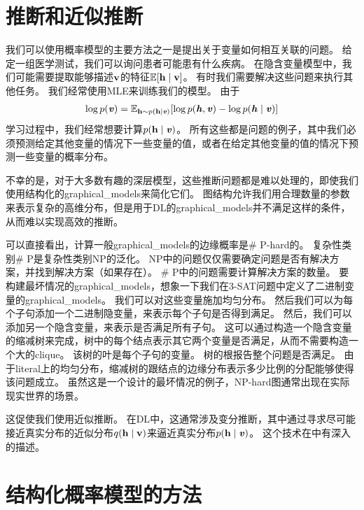 \section{推断和近似推断}
\label{sec:inference_and_approximate_inference}


我们可以使用概率模型的主要方法之一是提出关于变量如何相互关联的问题。 
给定一组医学测试，我们可以询问患者可能患有什么疾病。
在隐含变量模型中，我们可能需要提取能够描述$\mathbf{v}$的特征$\mathbb{E}[\mathbf{h} \mid \mathbf{v}]$。
有时我们需要解决这些问题来执行其他任务。 
我们经常使用\gls{MLE}来训练我们的模型。
由于
\begin{align}
\label{eqn:169}
\log p(\boldsymbol{\mathit{v}}) = \mathbb{E}_{\mathbf{h} \sim p(\mathbf{h}\mid \boldsymbol{\mathit{v}})} [\log p(\boldsymbol{\mathit{h}},\boldsymbol{\mathit{v}}) -  \log p(\boldsymbol{\mathit{h}}\mid\boldsymbol{\mathit{v}})]
\end{align}
学习过程中，我们经常想要计算$p(\mathbf{h}\mid\boldsymbol{\mathit{v}})$。
所有这些都是问题的例子，其中我们必须预测给定其他变量的情况下一些变量的值，或者在给定其他变量的值的情况下预测一些变量的概率分布。

不幸的是，对于大多数有趣的深层模型，这些推断问题都是难以处理的，即使我们使用结构化的\gls{graphical_models}来简化它们。
图结构允许我们用合理数量的参数来表示复杂的高维分布，但是用于\gls{DL}的\gls{graphical_models}并不满足这样的条件，从而难以实现高效的推断。


可以直接看出，计算一般\gls{graphical_models}的边缘概率是\# P-hard的。
复杂性类别\# P是复杂性类别NP的泛化。
NP中的问题仅仅需要确定问题是否有解决方案，并找到解决方案（如果存在）。
\# P中的问题需要计算解决方案的数量。
要构建最坏情况的\gls{graphical_models}，想象一下我们在3-SAT问题中定义了二进制变量的\gls{graphical_models}。
我们可以对这些变量施加均匀分布。
然后我们可以为每个子句添加一个二进制隐变量，来表示每个子句是否得到满足。
然后，我们可以添加另一个隐含变量，来表示是否满足所有子句。
这可以通过构造一个隐含变量的缩减树来完成，树中的每个结点表示其它两个变量是否满足，从而不需要构造一个大的\gls{clique}。
该树的叶是每个子句的变量。
树的根报告整个问题是否满足。
由于literal上的均匀分布，缩减树的跟结点的边缘分布表示多少比例的分配能够使得该问题成立。
虽然这是一个设计的最坏情况的例子，NP-hard图通常出现在实际现实世界的场景。


这促使我们使用近似推断。
在\gls{DL}中，这通常涉及变分推断，其中通过寻求尽可能接近真实分布的近似分布$q(\mathbf{h}\mid\mathbf{v})$来逼近真实分布$p(\mathbf{h}\mid\boldsymbol{\mathit{v}})$。
这个技术在中有深入的描述。



\section{结构化概率模型的方法}
\label{sec:the_deep_learning_approach_to_structured_probabilistic_models}

